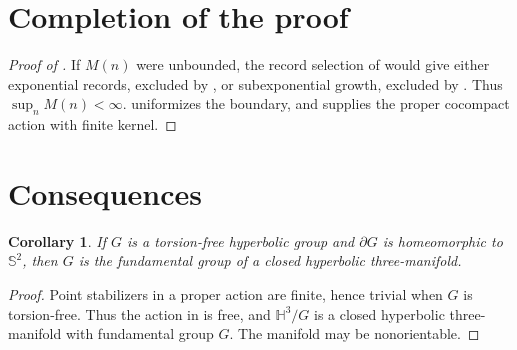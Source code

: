 \documentclass[11pt]{article}
\numberwithin{equation}{section}
\newtheorem{corollary}[corollary]{Corollary}
\theoremstyle{definition}
\theoremstyle{remark}
\newcommand{\HH}{\mathbb H}
\newcommand{\Sphere}{\mathbb S^2}
\begin{document}






\section{Completion of the proof}
\label{sec:completion}

\begin{proof}[Proof of ]
If $M(n)$ were unbounded, the record selection of 
would give either exponential records, excluded by
, or subexponential growth,
excluded by . Thus $\sup_n M(n)<\infty$.
 uniformizes the boundary, and
 supplies the proper cocompact action with finite kernel.
\end{proof}

\section{Consequences}
\label{sec:consequences}

\begin{corollary}
\label{cor:torsion-free}
If $G$ is a torsion-free hyperbolic group and $\partial G$ is homeomorphic to $\Sphere$,
then $G$ is the fundamental group of a closed hyperbolic three-manifold.
\end{corollary}
\begin{proof}
Point stabilizers in a proper action are finite, hence trivial when
$G$ is torsion-free. Thus the action in  is free, and
$\HH^3/G$ is a closed hyperbolic three-manifold with fundamental group
$G$. The manifold may be nonorientable.
\end{proof}
\end{document}
